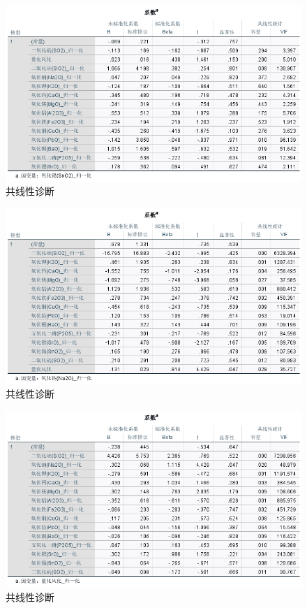 \documentclass[UTF8]{ctexart}
\begin{document}
\begin{figure}[H]\centering
    \includegraphics[width=1\textwidth,height=0.6\textwidth]{img/1 (18).png} %
    \caption{共线性诊断} %
\end{figure}
\begin{figure}[H]\centering
    \includegraphics[width=1\textwidth,height=0.6\textwidth]{img/1 (19).png} %
    \caption{共线性诊断} %
\end{figure}
\begin{figure}[H]\centering
    \includegraphics[width=1\textwidth,height=0.6\textwidth]{img/1 (20).png} %
    \caption{共线性诊断} %
\end{figure}
\end{document}
